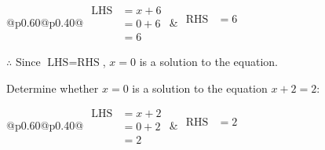 \documentclass[12pt]{article}
\newcounter{minipagecount}
\begin{document}
\begin{multicols}{2}
\begin{minipage}[t]{0.40\textwidth}
    \noindent
    \renewcommand{\arraystretch}{1.3} %
    \begin{tabular}{@{}p{0.60\linewidth}@{}p{0.40\linewidth}@{}}
        \(\begin{aligned}
            \text{LHS} &= x + 6 \\
                    &= 0 + 6 \\
                    &= 6 
        \end{aligned}\) &
        \(\begin{aligned}
            \text{RHS} &= 6\\
                    & \\
                    &
        \end{aligned}\)
    \end{tabular}
    \renewcommand{\arraystretch}{1.0} %
    \vspace{2pt}  %

    \noindent \(\therefore\) Since \(\text{LHS} = \text{RHS}\), \(x = 0\) is  a solution to the equation.

\end{minipage}

\vspace*{0.5ex}
\vfill{}
\noindent{(\theminipagecount)}\hspace{0.1mm} %
\begin{minipage}[t]{0.40\textwidth} %

    \noindent Determine whether \(x = 0\) is a solution to the equation \(x + 2 = 2\):
    \vspace{2pt}  %

    \noindent
    \renewcommand{\arraystretch}{1.3} %
    \begin{tabular}{@{}p{0.60\linewidth}@{}p{0.40\linewidth}@{}}
        \(\begin{aligned}
            \text{LHS} &= x + 2 \\
                    &= 0 + 2 \\
                    &= 2 
        \end{aligned}\) &
        \(\begin{aligned}
            \text{RHS} &= 2\\
                    & \\
                    &
        \end{aligned}\)
    \end{tabular}
    \renewcommand{\arraystretch}{1.0} %
    \vspace{2pt}  %


\end{minipage}
\end{multicols}
\end{document}
